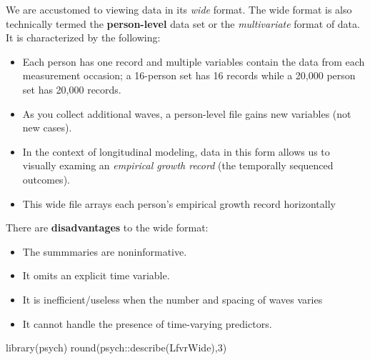 \documentclass[
  11pt,
]{book}
\newenvironment{Shaded}{\begin{snugshade}}{\end{snugshade}}
\newcommand{\DecValTok}[1]{\textcolor[rgb]{0.00,0.00,0.81}{#1}}
\newcommand{\FunctionTok}[1]{\textcolor[rgb]{0.00,0.00,0.00}{#1}}
\newcommand{\NormalTok}[1]{#1}
\newcommand{\SpecialCharTok}[1]{\textcolor[rgb]{0.00,0.00,0.00}{#1}}
\providecommand{\tightlist}{%
  \setlength{\itemsep}{0pt}\setlength{\parskip}{0pt}}
\begin{document}
We are accustomed to viewing data in its \emph{wide} format. The wide format is also technically termed the \textbf{person-level} data set or the \emph{multivariate} format of data. It is characterized by the following:

\begin{itemize}
\tightlist
\item
  Each person has one record and multiple variables contain the data from each measurement occasion; a 16-person set has 16 records while a 20,000 person set has 20,000 records.
\item
  As you collect additional waves, a person-level file gains new variables (not new cases).
\item
  In the context of longitudinal modeling, data in this form allows us to visually examing an \emph{empirical growth record} (the temporally sequenced outcomes).
\item
  This wide file arrays each person's empirical growth record horizontally
\end{itemize}

There are \textbf{disadvantages} to the wide format:

\begin{itemize}
\tightlist
\item
  The summmaries are noninformative.
\item
  It omits an explicit time variable.
\item
  It is inefficient/useless when the number and spacing of waves varies
\item
  It cannot handle the presence of time-varying predictors.
\end{itemize}

\begin{Shaded}
\begin{Highlighting}[]
\FunctionTok{library}\NormalTok{(psych)}
\FunctionTok{round}\NormalTok{(psych}\SpecialCharTok{::}\FunctionTok{describe}\NormalTok{(LfvrWide),}\DecValTok{3}\NormalTok{)}
\end{Highlighting}
\end{Shaded}
\end{document}
